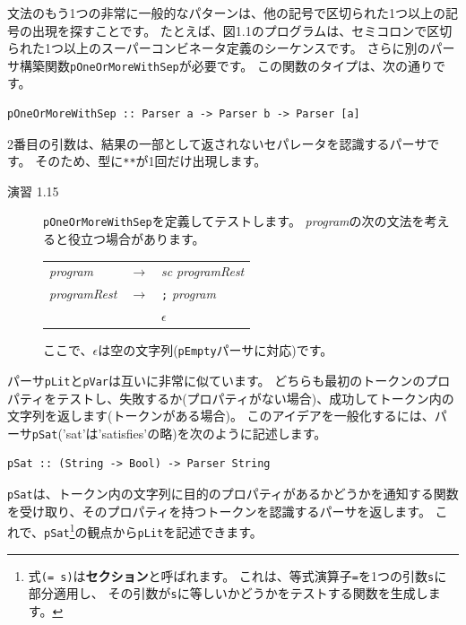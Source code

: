 \documentclass{jbook}
\begin{document}
文法のもう1つの非常に一般的なパターンは、他の記号で区切られた1つ以上の記号の出現を探すことです。
たとえば、図1.1のプログラムは、セミコロンで区切られた1つ以上のスーパーコンビネータ定義のシーケンスです。
さらに別のパーサ構築関数\texttt{pOneOrMoreWithSep}が必要です。
この関数のタイプは、次の通りです。
\begin{verbatim}
pOneOrMoreWithSep :: Parser a -> Parser b -> Parser [a]
\end{verbatim}
2番目の引数は、結果の一部として返されないセパレータを認識するパーサです。
そのため、型に\texttt{**}が1回だけ出現します。

\begin{description}
	\item[演習 1.15] \texttt{pOneOrMoreWithSep}を定義してテストします。
		\textit{program}の次の文法を考えると役立つ場合があります。

		\begin{center}
			\begin{tabular} {l c l}
				\textit{program}     & $\rightarrow$ & \textit{sc} \textit{programRest} \\
				\textit{programRest} & $\rightarrow$ & \texttt{;} \textit{program}      \\
				                     & \textbar      & $\epsilon$
			\end{tabular}
		\end{center}

		ここで、$\epsilon$は空の文字列(\texttt{pEmpty}パーサに対応)です。
\end{description}

パーサ\texttt{pLit}と\texttt{pVar}は互いに非常に似ています。
どちらも最初のトークンのプロパティをテストし、失敗するか(プロパティがない場合)、成功してトークン内の文字列を返します(トークンがある場合)。
このアイデアを一般化するには、パーサ\texttt{pSat}('sat'は'satisfies'の略)を次のように記述します。

\begin{verbatim}
pSat :: (String -> Bool) -> Parser String
\end{verbatim}

\texttt{pSat}は、トークン内の文字列に目的のプロパティがあるかどうかを通知する関数を受け取り、そのプロパティを持つトークンを認識するパーサを返します。
これで、\texttt{pSat}\footnote{式\texttt{(= s)}は\textbf{セクション}と呼ばれます。
	これは、等式演算子\texttt{=}を1つの引数\texttt{s}に部分適用し、
	その引数が\texttt{s}に等しいかどうかをテストする関数を生成します。}の観点から\texttt{pLit}を記述できます。
\end{document}
